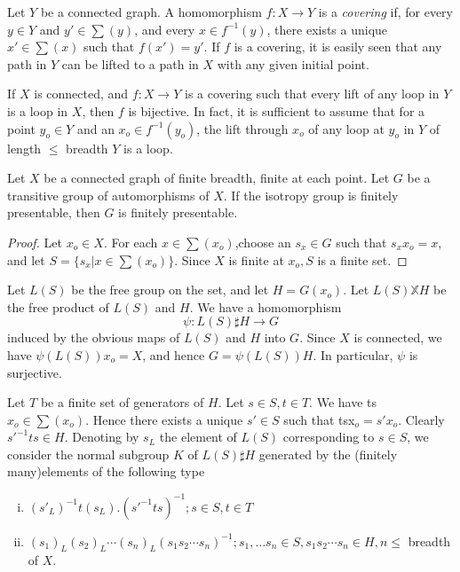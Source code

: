 Let $Y$ be a connected graph. A homomorphism $f:X \to Y$ is a 
\textit{covering} if, for every $y \in Y$ and $y' \in \sum(y)$, and every
$x \in f^{-1}(y)$, there exists a unique $x' \in \sum(x)$ such that
$f(x') =y'$. If $f$ is a covering, it is easily seen that any path in
$Y$ can be lifted to a path in $X$ with any given initial point. 

If $X$ is connected, and $f: X \to Y$ is a covering such that every
lift of any loop in $Y$ is a loop in $X$, then $f$ is bijective. In
fact, it is sufficient to assume that for a point $y_o \in Y$ and an
$x_o \in f^{-1}(y_o)$, the lift through $x_o$ of any loop at $y_o$ in
$Y$ of length $\leq $ breadth $Y$ is a loop. 

\begin{thm}\label{chap3:thm2}%
  Let $X$ be a connected graph of finite breadth, finite at each point.
  Let $G$ be a transitive group of automorphisms of $X$. If the isotropy
  group is finitely presentable, then $G$ is finitely presentable.\pageoriginale 
\end{thm}

\begin{proof}
  Let $x_o \in X$. For each $x \in \sum (x_o)$,choose an $s_x \in G$
  such that $s_x x_o =x$, and let $S = \{ s_x |x \in \sum(x_o)\}$. Since
  $X$ is finite  at $x_o, S$ is a finite set. 
\end{proof}

Let $L(S)$ be the free group on the set, and let $H= G(x_o)$. Let
$L(S) \mathbb{X} H$ be the free product of $L(S)$ and $H$. We have a
homomorphism 
$$
\psi : L (S) \sharp H \to G
$$
induced by the obvious maps of $L(S)$ and $H$ into $G$. Since $X$ is
connected, we have $\psi (L(S)) x_o =X$, and hence $G = \psi
(L(S))H$. In particular, $\psi$ is surjective. 

Let $T$ be a finite set of generators of $H$. Let $s \in S, t \in
T$. We have ts$x_o \in \sum(x_o)$. Hence there exists a unique $s' \in
S$ such that tsx$_o = s' x_o$. Clearly ${s'}^{-1}ts \in H$. Denoting by
$s_L$ the element of $L(S)$ corresponding to $s \in S$, we consider
the normal subgroup $K$ of $L(S) \sharp H$ generated by the (finitely
many)elements of the following type  
\begin{enumerate}[(i)]
\item $(s'_{L})^{-1} t (s_L). (s'^{-1}ts)^{-1}; s \in S, t \in T$
\item $(s_1)_L (s_2)_L \cdots (s_n)_L (s_1 s_2 \cdots s_n)^{-1}; s_1,
  \ldots s_n \in S ,s_1 s_2 \cdots s_n \in H , n \leq $ breadth of
  $X$. 
\end{enumerate}

